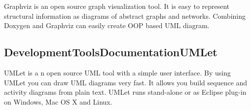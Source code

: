 Graphviz is an open source graph visualization tool. It is easy to represent structural information as diagrams of abstract graphs and networks. Combining Doxygen and Graphviz can easily create O\+O\+P based U\+M\+L diagram. \hypertarget{_development_tools_DevelopmentToolsDocumentationUMLet}{}\subsection{Development\+Tools\+Documentation\+U\+M\+Let}\label{_development_tools_DevelopmentToolsDocumentationUMLet}
U\+M\+Let is a n open source U\+M\+L tool with a simple user interface. By using U\+M\+Let you can draw U\+M\+L diagrams very fast. It allows you build sequence and activity diagrams from plain text. U\+M\+Let runs stand-\/alone or as Eclipse plug-\/in on Windows, Mac O\+S X and Linux. 